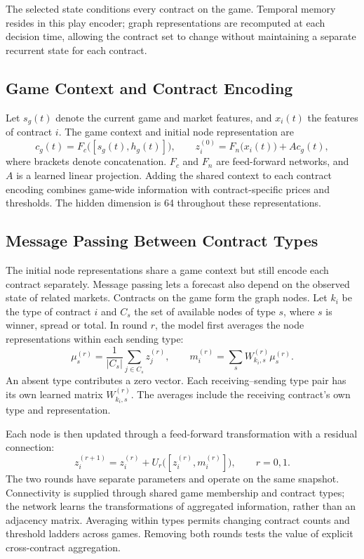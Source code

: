 \documentclass[12pt,a4paper,oneside]{report}
\begin{document}
The selected state conditions every contract on the game. Temporal memory
resides in this play encoder; graph representations are recomputed at each
decision time, allowing the contract set to change without maintaining a
separate recurrent state for each contract.

\subsection{Game Context and Contract Encoding}
Let $s_g(t)$ denote the current game and market features, and $x_i(t)$ the
features of contract $i$. The game context and initial node representation are
\begin{equation}
 c_g(t)=F_c\bigl([s_g(t),h_g(t)]\bigr),\qquad
 z_i^{(0)}=F_n\bigl(x_i(t)\bigr)+A c_g(t),
 \label{eq:node-encoding}
\end{equation}
where brackets denote concatenation. $F_c$ and $F_n$ are feed-forward networks,
and $A$ is a learned linear projection. Adding the shared context to each
contract encoding combines game-wide information with contract-specific prices
and thresholds. The hidden dimension is 64 throughout these representations.

\subsection{Message Passing Between Contract Types}
The initial node representations share a game context but still encode each
contract separately. Message passing lets a forecast also depend on the
observed state of related markets. Contracts on the game form the graph nodes.
Let $k_i$ be
the type of contract $i$ and $C_s$ the set of available nodes of type $s$, where
$s$ is winner, spread or total. In round $r$, the model first averages the node
representations within each sending type:
\begin{equation}
 \mu_s^{(r)}=\frac{1}{|C_s|}\sum_{j\in C_s}z_j^{(r)},\qquad
 m_i^{(r)}=\sum_s W_{k_i,s}^{(r)}\mu_s^{(r)}.
 \label{eq:contract-messages}
\end{equation}
An absent type contributes a zero vector. Each receiving--sending type pair has
its own learned matrix $W_{k_i,s}^{(r)}$. The averages include the receiving
contract's own type and representation.

Each node is then updated through a feed-forward transformation with a residual
connection:
\begin{equation}
 z_i^{(r+1)}=z_i^{(r)}+U_r\bigl([z_i^{(r)},m_i^{(r)}]\bigr),
 \qquad r=0,1.
 \label{eq:contract-update}
\end{equation}
The two rounds have separate parameters and operate on the same snapshot.
Connectivity is supplied through
shared game membership and contract types; the network learns the transformations
of aggregated information, rather than an adjacency matrix. Averaging within
types permits changing contract counts and threshold ladders across games.
Removing both rounds tests the value of explicit cross-contract aggregation.
\end{document}
